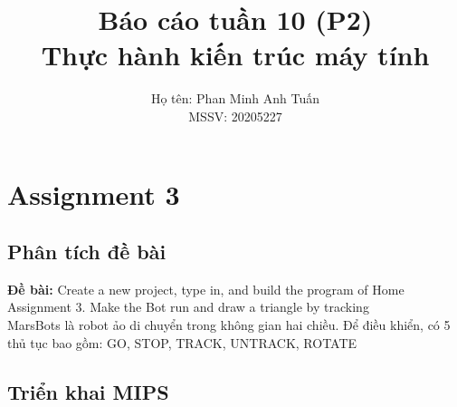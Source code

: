 \documentclass[a4paper,12pt]{article}
\title{\textbf{Báo cáo tuần 10 (P2) \\ Thực hành kiến trúc máy tính}}
\author{Họ tên: Phan Minh Anh Tuấn \\ MSSV: 20205227}
\date{}
\begin{document}
\maketitle
\tableofcontents
\newpage
\section{Assignment 3}
\subsection{Phân tích đề bài}
\textbf{Đề bài: }Create a new project, type in, and build the program of Home Assignment 3. Make the Bot run and draw a triangle by tracking \\
MarsBots là robot ảo di chuyển trong không gian hai chiều. Để điều khiển, có 5 thủ tục bao gồm: GO, STOP, TRACK, UNTRACK, ROTATE
\subsection{Triển khai MIPS}
\end{document}
